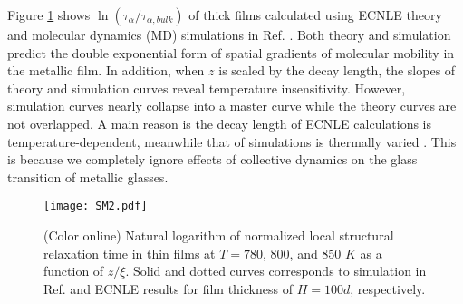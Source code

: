 \documentclass[twocolumn,preprintnumbers,amsmath,amssymb,superscriptaddress]{revtex4}
\begin{document}
Figure \ref{fig:SM2} shows $\ln(\tau_\alpha/\tau_{\alpha,bulk})$ of  thick films calculated using ECNLE theory and molecular dynamics (MD) simulations in Ref. \cite{14}. Both theory and simulation predict the double exponential form of spatial gradients of molecular mobility in the metallic film. In addition, when $z$ is scaled by the decay length, the slopes of theory and simulation curves reveal temperature insensitivity. However, simulation curves nearly collapse into a master curve while the theory curves are not overlapped. A main reason is the decay length of ECNLE calculations is temperature-dependent, meanwhile that of simulations is thermally varied \cite{14}. This is because we completely ignore effects of collective dynamics on the glass transition of metallic glasses. 

\begin{figure}[htp]
\texttt{[image: SM2.pdf]}
\caption{\label{fig:SM2}(Color online) Natural logarithm of normalized local structural relaxation time in  thin films at $T = 780$, 800, and 850 $K$ as a function of $z/\xi$. Solid and dotted curves corresponds to simulation in Ref.\cite{14} and ECNLE results for film thickness of $H = 100d$, respectively.}
\end{figure}
\end{document}
